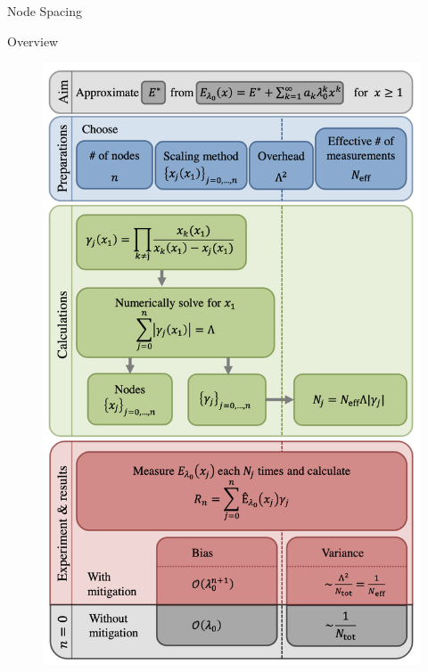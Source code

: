 \documentclass[11pt,aspectratio=1610,xcolor=dvipsnames]{beamer}
\begin{document}
\begin{frame}{Node Spacing}
\end{frame}

\begin{frame}{Overview}
	\begin{figure}[h]
		\centering
		\includegraphics[height=0.95\textheight]{overview.png}
	\end{figure}
\end{frame}
\end{document}
